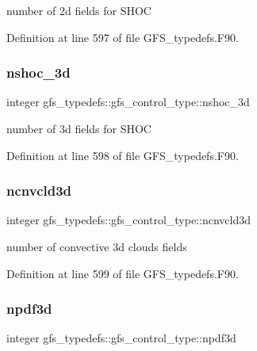number of 2d fields for S\+H\+OC 



Definition at line 597 of file G\+F\+S\+\_\+typedefs.\+F90.

\mbox{\label{structgfs__typedefs_1_1gfs__control__type_ac5eaf2b349fa26af3d3605c1afe3bc7f}} 
\subsubsection{nshoc\+\_\+3d}
{\footnotesize\ttfamily integer gfs\+\_\+typedefs\+::gfs\+\_\+control\+\_\+type\+::nshoc\+\_\+3d}



number of 3d fields for S\+H\+OC 



Definition at line 598 of file G\+F\+S\+\_\+typedefs.\+F90.

\mbox{\label{structgfs__typedefs_1_1gfs__control__type_a5bb7a9a5191b606f6f4ebe577b2b6c12}} 
\subsubsection{ncnvcld3d}
{\footnotesize\ttfamily integer gfs\+\_\+typedefs\+::gfs\+\_\+control\+\_\+type\+::ncnvcld3d}



number of convective 3d clouds fields 



Definition at line 599 of file G\+F\+S\+\_\+typedefs.\+F90.

\mbox{\label{structgfs__typedefs_1_1gfs__control__type_a2ae5fb72854bb315c04b92340bb98ae0}} 
\subsubsection{npdf3d}
{\footnotesize\ttfamily integer gfs\+\_\+typedefs\+::gfs\+\_\+control\+\_\+type\+::npdf3d}



